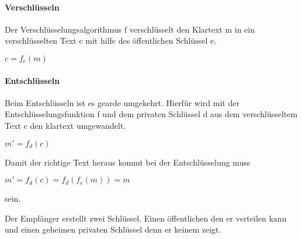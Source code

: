 \paragraph{Verschlüsseln}
Der Verschlüsselungsalgorithmus f verschlüsselt den Klartext m in ein verschlüsselten Text c mit hilfe des öffentlichen Schlüssel e.
 \begin{center}
 $ c = f_e (m) $
 \end{center}
%
\paragraph{Entschlüsseln}
Beim Entschlüsseln ist es gearde umgekehrt. Hierfür wird mit der Entschlüsselungsfunktion f und dem privaten Schlüssel d aus dem verschlüsseltem Text c den klartext umgewandelt.
\begin{center}
$ m' = f_d (c) $
\end{center}
Damit der richtige Text heraus kommt bei der Entschlüsselung muss 
\begin{center}
$ m' = f_d (c) = f_d(f_e(m))  = m$
\end{center}
sein.


Der Empfänger erstellt zwei Schlüssel. Einen öffentlichen den er verteilen kann und einen geheimen privaten Schlüssel denn er keinem zeigt. 
